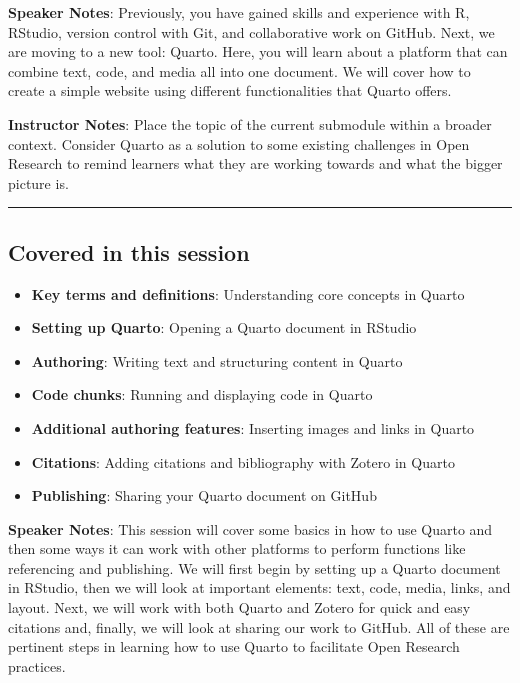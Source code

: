 \documentclass[
  letterpaper,
  DIV=11,
  numbers=noendperiod]{scrartcl}
\providecommand{\tightlist}{%
  \setlength{\itemsep}{0pt}\setlength{\parskip}{0pt}}
\begin{document}
\textbf{Speaker Notes}: Previously, you have gained skills and
experience with R, RStudio, version control with Git, and collaborative
work on GitHub. Next, we are moving to a new tool: Quarto. Here, you
will learn about a platform that can combine text, code, and media all
into one document. We will cover how to create a simple website using
different functionalities that Quarto offers.

\textbf{Instructor Notes}: Place the topic of the current submodule
within a broader context. Consider Quarto as a solution to some existing
challenges in Open Research to remind learners what they are working
towards and what the bigger picture is.

\begin{center}\rule{0.5\linewidth}{0.5pt}\end{center}

\subsection{Covered in this session}\label{covered-in-this-session}

\begin{itemize}
\tightlist
\item
  \textbf{Key terms and definitions}: Understanding core concepts in
  Quarto
\item
  \textbf{Setting up Quarto}: Opening a Quarto document in RStudio
\item
  \textbf{Authoring}: Writing text and structuring content in Quarto
\item
  \textbf{Code chunks}: Running and displaying code in Quarto
\item
  \textbf{Additional authoring features}: Inserting images and links in
  Quarto
\item
  \textbf{Citations}: Adding citations and bibliography with Zotero in
  Quarto
\item
  \textbf{Publishing}: Sharing your Quarto document on GitHub
\end{itemize}

\textbf{Speaker Notes}: This session will cover some basics in how to
use Quarto and then some ways it can work with other platforms to
perform functions like referencing and publishing. We will first begin
by setting up a Quarto document in RStudio, then we will look at
important elements: text, code, media, links, and layout. Next, we will
work with both Quarto and Zotero for quick and easy citations and,
finally, we will look at sharing our work to GitHub. All of these are
pertinent steps in learning how to use Quarto to facilitate Open
Research practices.
\end{document}
